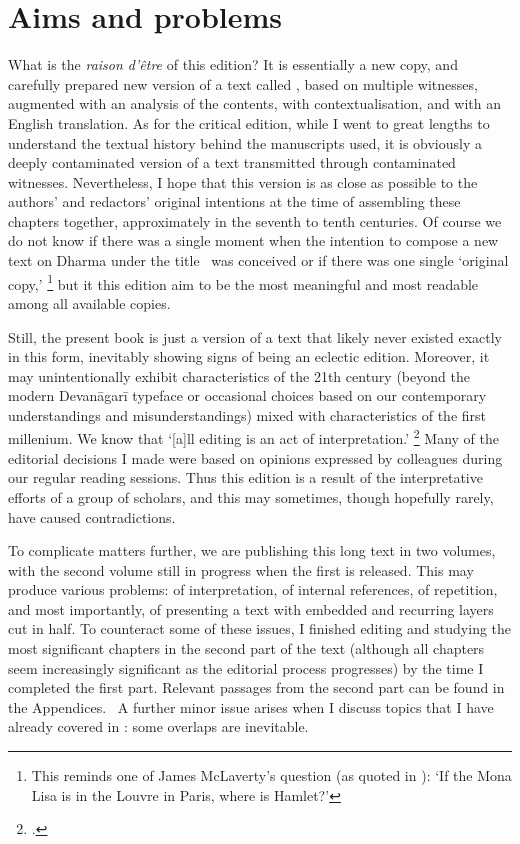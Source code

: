 

\section{Aims and problems}
\frenchspacing

\noindent
What is the \textit{raison d'\^etre} of this edition? 
It is essentially a new copy, and carefully prepared new version
of a text called \Vss, based on multiple witnesses,
augmented with an analysis of the contents, with
contextualisation, and with an English translation.
As for the critical edition, while I went to great 
lengths to understand the textual history behind 
the manuscripts used, it is obviously a deeply contaminated 
version of a text transmitted through contaminated witnesses.
Nevertheless, I hope that this version is as 
close as possible to the authors' and redactors' original intentions at the time of assembling these chapters together, approximately in the seventh to tenth centuries. 
Of course we do not know if there was a single moment
when the intention to compose a new text on Dharma
under the title \Vss\ was conceived or if there was one single
`original copy,'%
		\footnote{This reminds one of James McLaverty's
                  question (as quoted in
   				  ):
                 `If the Mona Lisa is in the Louvre in Paris, 	
                 where is Hamlet?'}
but it this edition aim to be the most meaningful and most readable among all available copies. 

Still, the present book is just a
version of a text that likely never existed exactly 
in this form, inevitably showing
signs of being an eclectic edition. 
Moreover, it may unintentionally exhibit 
characteristics of the 21th century 
(beyond the modern Devanāgarī typeface
or occasional choices based on our contemporary
understandings and misunderstandings) 
mixed with characteristics of the first millenium. 
We know that `[a]ll editing is an act of interpretation.'%
		\footnote{.}
Many of the editorial decisions I made were based
on opinions expressed by colleagues during our
regular reading sessions. Thus this edition is a result
of the interpretative efforts of a group of scholars, and
this may sometimes, though hopefully rarely, have caused contradictions.

To complicate matters further, we are publishing this long text
in two volumes, with the second volume still in progress
when the first is released. This may produce various problems:
of interpretation, of internal references, of repetition, 
and most importantly, of presenting a text with
embedded and recurring layers cut in half. To counteract
some of these issues, I finished editing and 
studying the most significant chapters in 
the second part of the text (although all chapters seem 
increasingly significant as the editorial process progresses)
by the time I completed the first part. 
Relevant passages from the second part can be found in 
the Appendices. \CHECK\ A further minor issue arises when
I discuss topics that I have already covered in
: some overlaps are inevitable.

